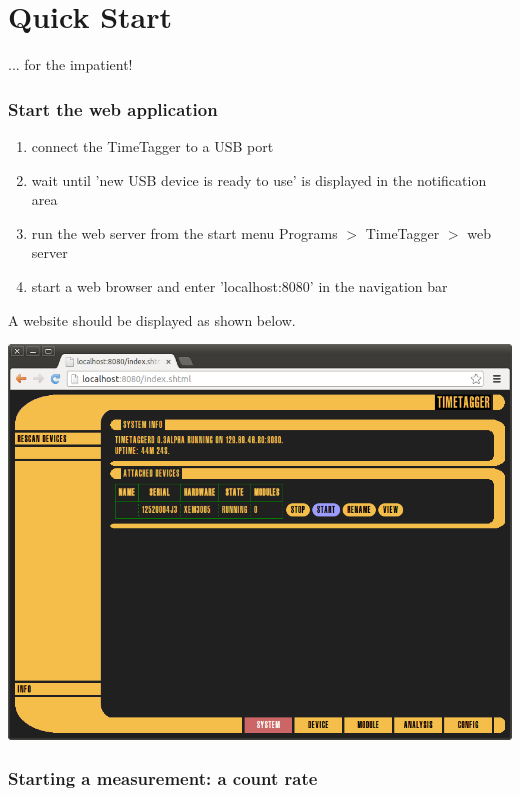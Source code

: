 \documentclass[oneside]{memoir}
\begin{document}
\chapter{Quick Start}

... for the impatient!

\subsection{Start the web application}

\begin{enumerate}
 \item connect the TimeTagger to a USB port
 \item wait until 'new USB device is ready to use' is displayed in the notification area
 \item run the web server from the start menu Programs $>$ TimeTagger $>$ web server
 \item start a web browser and enter 'localhost:8080' in the navigation bar
\end{enumerate}
A website should be displayed as shown below.
\begin{center}
\includegraphics[scale=0.4]{figures/web_application.png}
\end{center}

\subsection{Starting a measurement: a count rate}
\end{document}
